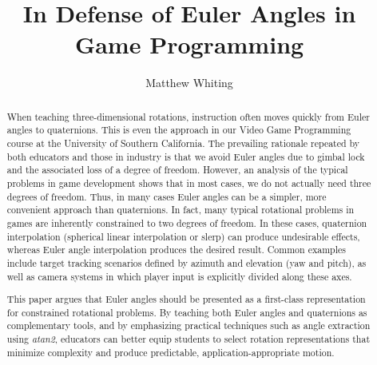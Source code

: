 \documentclass[sigconf]{acmart}
\begin{document}
\title{In Defense of Euler Angles in Game Programming}

\author{Matthew Whiting}

\begin{abstract}
When teaching three-dimensional rotations, instruction often moves quickly from Euler angles to quaternions. This is even the approach in our Video Game Programming course at the University of Southern California. The prevailing rationale repeated by both educators and those in industry is that we avoid Euler angles due to gimbal lock and the associated loss of a degree of freedom. However, an analysis of the typical problems in game development shows that in most cases, we do not actually need three degrees of freedom. Thus, in many cases Euler angles can be a simpler, more convenient approach than quaternions. In fact, many typical rotational problems in games are inherently constrained to two degrees of freedom. In these cases, quaternion interpolation (spherical linear interpolation or slerp) can produce undesirable effects, whereas Euler angle interpolation produces the desired result. Common examples include target tracking scenarios defined by azimuth and elevation (yaw and pitch), as well as camera systems in which player input is explicitly divided along these axes.
  
This paper argues that Euler angles should be presented as a first-class representation for constrained rotational problems. By teaching both Euler angles and quaternions as complementary tools, and by emphasizing practical techniques such as angle extraction using \textit{atan2}, educators can better equip students to select rotation representations that minimize complexity and produce predictable, application-appropriate motion.
\end{abstract}
\end{document}

